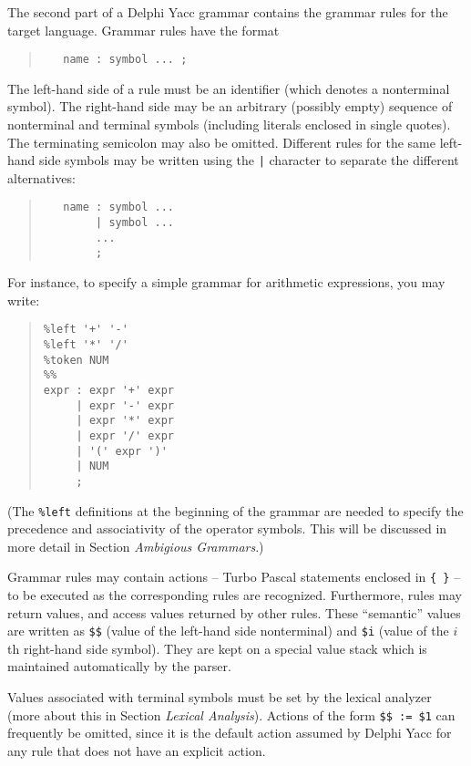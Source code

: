 \documentclass{article}
\begin{document}
The second part of a Delphi Yacc grammar contains the grammar rules for the
target language. Grammar rules have the format

\begin{quote}\begin{verbatim}
   name : symbol ... ;
\end{verbatim}\end{quote}

The left-hand side of a rule must be an identifier (which denotes a
nonterminal symbol). The right-hand side may be an arbitrary (possibly
empty) sequence of nonterminal and terminal symbols (including literals
enclosed in single quotes). The terminating semicolon may also be omitted.
Different rules for the same left-hand side symbols may be written using
the \verb"|" character to separate the different alternatives:

\begin{quote}\begin{verbatim}
   name : symbol ...
        | symbol ...
        ...
        ;
\end{verbatim}\end{quote}

For instance, to specify a simple grammar for arithmetic expressions, you
may write:

\begin{quote}\begin{verbatim}
%left '+' '-'
%left '*' '/'
%token NUM
%%
expr : expr '+' expr
     | expr '-' expr
     | expr '*' expr
     | expr '/' expr
     | '(' expr ')'
     | NUM
     ;
\end{verbatim}\end{quote}

(The \verb"%left" definitions at the beginning of the grammar are needed to
specify the precedence and associativity of the operator symbols. This will be
discussed in more detail in Section {\em Ambigious Grammars\/}.)

Grammar rules may contain actions -- Turbo Pascal statements enclosed in
\verb"{ }" -- to be executed as the corresponding rules are recognized.
Furthermore, rules may return values, and access values returned by other
rules. These ``semantic'' values are written as \verb"$$" (value of the
left-hand side nonterminal) and \verb"$i" (value of the $i$th right-hand
side symbol). They are kept on a special value stack which is maintained
automatically by the parser.

Values associated with terminal symbols must be set by the lexical analyzer
(more about this in Section {\em Lexical Analysis\/}). Actions of the form
\verb"$$ := $1" can frequently be omitted, since it is the default action
assumed by Delphi Yacc for any rule that does not have an explicit action.
\end{document}
